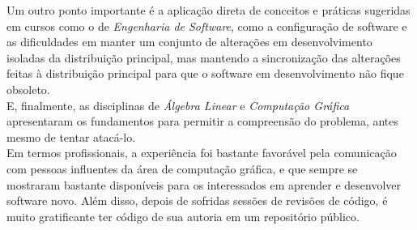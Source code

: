 Um outro ponto importante é a aplicação direta de conceitos e práticas sugeridas em cursos como o de \emph{Engenharia de Software}, como a configuração de software e as dificuldades em manter um conjunto de alterações em desenvolvimento isoladas da distribuição principal, mas mantendo a sincronização das alterações feitas à distribuição principal para que o software em desenvolvimento não fique obsoleto. \\

E, finalmente, as disciplinas de \emph{Álgebra Linear} e \emph{Computação Gráfica} apresentaram os fundamentos para permitir a compreensão do problema, antes mesmo de tentar atacá-lo. \\

Em termos profissionais, a experiência foi bastante favorável pela comunicação com pessoas influentes da área de computação gráfica, e que sempre se mostraram bastante disponíveis para os interessados em aprender e desenvolver software novo. Além disso, depois de sofridas sessões de revisões de código, é muito gratificante ter código de sua autoria em um repositório público.